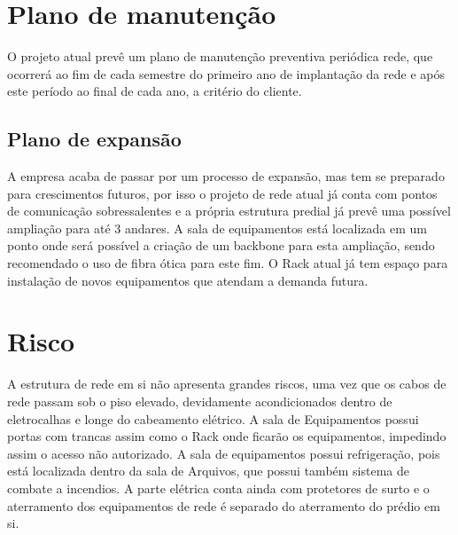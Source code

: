 \documentclass[	DIV=calc,%
paper=a4,%
fontsize=12pt,%
onecolumn]{scrartcl}	 					%
\begin{document}
	\section{Plano de manutenção}
	
	O projeto atual prevê um plano de manutenção preventiva periódica  rede, que ocorrerá ao fim de cada semestre do primeiro ano de implantação da rede e após este período ao final de cada ano, a critério do cliente.
	
	\subsection{Plano de expansão}
	A empresa acaba de passar por um processo de expansão, mas tem se preparado para crescimentos futuros, por isso o projeto de rede atual já conta com pontos de comunicação sobressalentes e a própria estrutura predial já prevê uma possível ampliação para até 3 andares. A sala de equipamentos está localizada em um ponto onde será possível a criação de um backbone para esta  ampliação, sendo recomendado o uso de fibra ótica para este fim. O Rack atual já tem espaço para instalação de novos equipamentos que atendam a demanda futura.
	
	\section{Risco}
	A estrutura de rede em si não apresenta grandes riscos, uma vez que os cabos de rede passam sob o piso elevado, devidamente acondicionados dentro de eletrocalhas e longe do cabeamento elétrico. A sala de Equipamentos possui portas com trancas assim como o Rack onde ficarão os equipamentos, impedindo assim o acesso não autorizado. A sala de equipamentos possui refrigeração, pois está localizada dentro da sala de Arquivos, que possui também sistema de combate a incendios. A parte elétrica conta ainda com protetores de surto e o aterramento dos equipamentos de rede é separado do aterramento do prédio em si.
	
\end{document}
